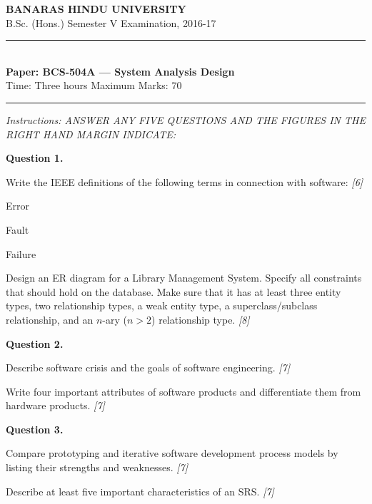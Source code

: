 \documentclass[11pt,a4paper]{article}
\newcommand{\pts}[1]{\hfill\textit{[#1]}}
\begin{document}
\begin{center}
  {\large\bfseries BANARAS HINDU UNIVERSITY}\\[2pt]
  {\normalsize B.Sc. (Hons.) Semester V Examination, 2016-17}\\[6pt]
  \rule{0.8\linewidth}{0.5pt}\\[6pt]
  {\large\bfseries Paper: BCS-504A --- System Analysis Design}\\[4pt]
  {\normalsize Time: Three hours \hfill Maximum Marks: 70}
\end{center}

\rule{\linewidth}{0.4pt}

\smallskip
\noindent\textit{Instructions: ANSWER ANY FIVE QUESTIONS AND THE FIGURES IN THE RIGHT HAND MARGIN INDICATE:}

\bigskip

\medskip\noindent\textbf{Question 1.}
\begin{parts}
  \item Write the IEEE definitions of the following terms in connection with software: \pts{6}
  \begin{parts}
    \item Error
    \item Fault
    \item Failure
  \end{parts}
  \item Design an ER diagram for a Library Management System. Specify all constraints that should hold on the database. Make sure that it has at least three entity types, two relationship types, a weak entity type, a superclass/subclass relationship, and an $n$-ary ($n > 2$) relationship type. \pts{8}
\end{parts}

\medskip\noindent\textbf{Question 2.}
\begin{parts}
  \item Describe software crisis and the goals of software engineering. \pts{7}
  \item Write four important attributes of software products and differentiate them from hardware products. \pts{7}
\end{parts}

\medskip\noindent\textbf{Question 3.}
\begin{parts}
  \item Compare prototyping and iterative software development process models by listing their strengths and weaknesses. \pts{7}
  \item Describe at least five important characteristics of an SRS. \pts{7}
\end{parts}
\end{document}
